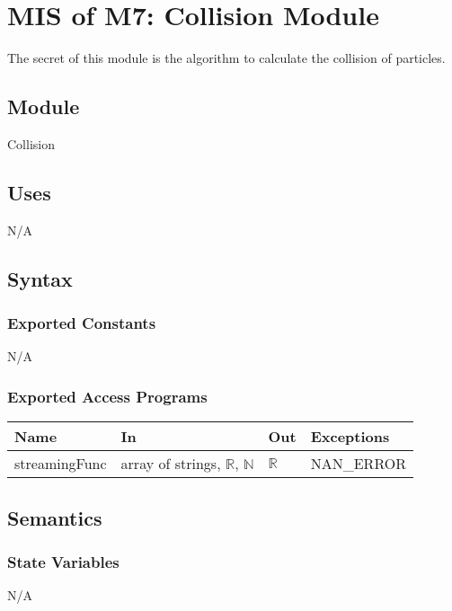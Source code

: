 \documentclass[12pt, titlepage]{article}
\begin{document}
\newpage

\section{MIS of M7: Collision Module} \label{COModule} 

The secret of this module is the algorithm to calculate the collision of particles.

\subsection{Module}

Collision

\subsection{Uses}
N/A

\subsection{Syntax}

\subsubsection{Exported Constants}
N/A

\subsubsection{Exported Access Programs}

\begin{center}
	\begin{tabular}{p{3cm} p{4cm} p{2cm} p{2cm}}
		\hline
		\textbf{Name} & \textbf{In} & \textbf{Out} & \textbf{Exceptions} \\
		\hline
		streamingFunc & array of strings, $\mathbb{R}$, $\mathbb{N}$ & $\mathbb{R}$ & NAN\_ERROR \\
		\hline
	\end{tabular}
\end{center}

\subsection{Semantics}

\subsubsection{State Variables}
N/A
\end{document}
